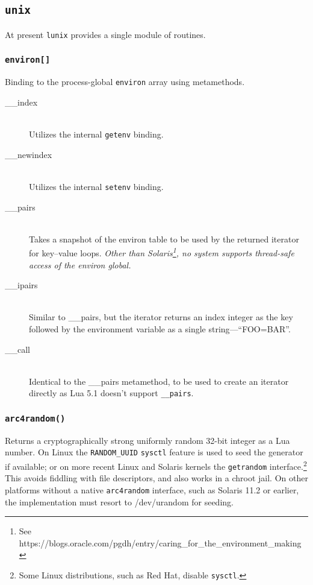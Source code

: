 \documentclass[11pt, oneside]{memoir}
\newcommand*{\lunix}[0]{\texttt{lunix}\xspace}
\newcommand*{\syscall}[1]{\texttt{#1}\xspace}
\newcommand*{\fn}[1]{\texttt{#1}\xspace}
\newcommand*{\const}[1]{\texttt{#1}\xspace}
\newcounter{toccols}
\newenvironment{Module}[1]{
	\subsection{\texttt{#1}}
	\addtocontents{toc}{
		\protect\begin{multicols}{\value{toccols}}
	}
}{
	\addtocontents{toc}{\protect\end{multicols}}
}
\begin{document}
\begin{Module}{unix}

At present \lunix provides a single module of routines.

\subsubsection[\fn{environ[]}]{\fn{environ[]}}

Binding to the process-global \texttt{environ} array using metamethods.

\begin{description}
\item[\_\_index] \hfill \\
Utilizes the internal \fn{getenv} binding.
\item[\_\_newindex] \hfill \\
Utilizes the internal \fn{setenv} binding.
\item[\_\_pairs] \hfill \\
Takes a snapshot of the environ table to be used by the returned iterator for key--value loops. \emph{Other than Solaris\footnote{See https://blogs.oracle.com/pgdh/entry/caring\_for\_the\_environment\_making}, no system supports thread-safe access of the environ global.}
\item[\_\_ipairs] \hfill \\
Similar to \_\_pairs, but the iterator returns an index integer as the key followed by the environment variable as a single string---``FOO=BAR''.
\item[\_\_call] \hfill \\
Identical to the \_\_pairs metamethod, to be used to create an iterator directly as Lua 5.1 doesn't support \texttt{\_\_pairs}.
\end{description}

\subsubsection[\fn{arc4random}]{\fn{arc4random()}}

Returns a cryptographically strong uniformly random 32-bit integer as a Lua number. On Linux the \const{RANDOM\_UUID} \fn{sysctl} feature is used to seed the generator if available; or on more recent Linux and Solaris kernels the \syscall{getrandom} interface.\footnote{Some Linux distributions, such as Red Hat, disable \syscall{sysctl}.} This avoids fiddling with file descriptors, and also works in a chroot jail. On other platforms without a native \fn{arc4random} interface, such as Solaris 11.2 or earlier, the implementation must resort to /dev/urandom for seeding.


\end{Module}
\end{document}
